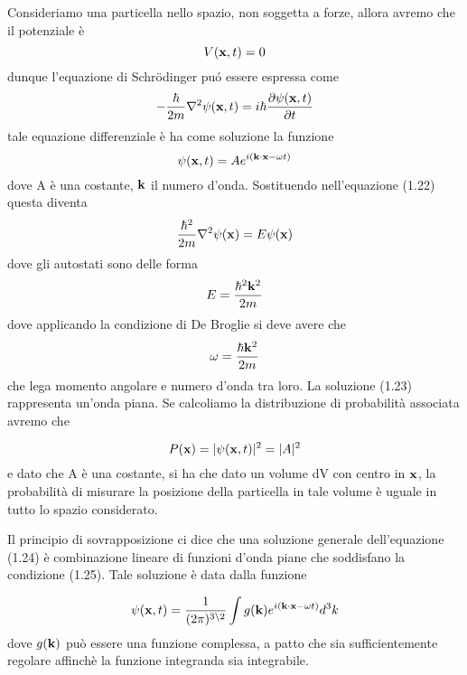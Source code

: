 Consideriamo una particella nello spazio, non soggetta a forze, allora avremo che il potenziale \`e 
\begin{equation*}
	V(\bold{x},t) = 0 
\end{equation*}
dunque l'equazione di Schr\"odinger pu\'o essere espressa come 
\begin{equation}
	-\frac{\hbar}{2m}\nabla^2 \psi(\bold{x},t) = i\hbar \frac{\partial \psi(\bold{x},t)}{\partial t}
\end{equation}
tale equazione differenziale \`e ha come soluzione la funzione 
\begin{equation}
	\psi(\bold{x},t) = Ae^{i(\bold{k}\cdot\bold{x} - \omega t)}
\end{equation}
 dove A \`e una costante, $\bold{k}$ il numero d'onda. Sostituendo nell'equazione (1.22) questa diventa 
 \begin{equation}
 	\frac{\hbar^2}{2m}\nabla^2 \psi(\bold{x}) = E\psi(\bold{x})
 \end{equation}
dove gli autostati sono delle forma 
\begin{equation*}
	E = \frac{\hbar^2 \bold{k}^2}{2m}
\end{equation*}
dove applicando la condizione di De Broglie si deve avere che 
\begin{equation}
	\omega = \frac{\hbar \bold{k}^2}{2m}
\end{equation}
che lega momento angolare e numero d'onda tra loro. La soluzione (1.23) rappresenta un'onda piana. Se calcoliamo la distribuzione di probabilit\`a associata avremo che 

\begin{equation*}
	P(\bold{x}) = |\psi(\bold{x},t)|^2 = |A|^2
\end{equation*}
e dato che A \`e una costante, si ha che dato un volume dV con centro in $\bold{x}$, la probabilit\`a di misurare la posizione della particella in tale volume \`e uguale in tutto lo spazio considerato.
\newline

\noindent Il principio di sovrapposizione ci dice che una soluzione generale dell'equazione (1.24) \`e combinazione lineare di funzioni d'onda piane che soddisfano la condizione (1.25). Tale soluzione \`e data dalla funzione 

\begin{equation}
	\psi(\bold{x},t) = \frac{1}{(2\pi)^{3 \backslash 2}} \int g(\bold{k})e^{i(\bold{k} \cdot \bold{x}-\omega t)}d^3k
\end{equation}
dove $g(\bold{k})$ pu\`o essere una funzione complessa, a patto che sia sufficientemente regolare affinch\`e la funzione integranda sia integrabile.

